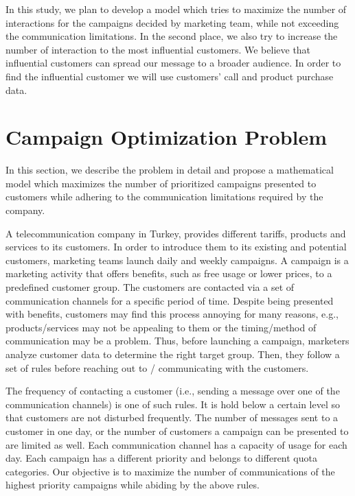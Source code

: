 \documentclass[11pt]{article}
\begin{document}
In this study, we plan to develop a model which tries to maximize the number of interactions for the campaigns decided by marketing team, while not exceeding the communication limitations. In the second place, we also try to increase the number of interaction to the most influential customers. We believe that influential customers can spread our message to a broader audience. In order to find the influential customer we will use customers' call and product purchase data.

\section{Campaign Optimization Problem}  \label{s:problem-model}

In this section, we describe the problem in detail and propose a mathematical model which maximizes the number of prioritized campaigns presented to customers while adhering to the communication limitations required by the company.



A telecommunication company in Turkey, provides different tariffs, products and services to its customers. In order to introduce them to its existing and potential customers, marketing teams launch daily and weekly campaigns. A campaign is a marketing activity that offers benefits, such as free usage or lower prices, to a predefined customer group. The customers are contacted via a set of communication channels for a specific period of time. Despite being presented with benefits, customers may find this process annoying for many reasons, e.g., products/services may not be appealing to them or the timing/method of communication may be a problem. Thus, before launching a campaign, marketers analyze customer data to determine the right target group. Then, they follow a set of rules before reaching out to / communicating with the customers.

The frequency of contacting a customer (i.e., sending a message over one of the communication channels) is one of such rules. It is hold below a certain level so that customers are not disturbed frequently. The number of messages sent to a customer in one day, or the number of customers a campaign can be presented to are limited as well. Each communication channel has a capacity of usage for each day. Each campaign has a different priority and belongs to different quota categories. Our objective is to maximize the number of communications of the highest priority campaigns while abiding by the above rules.  
\end{document}
